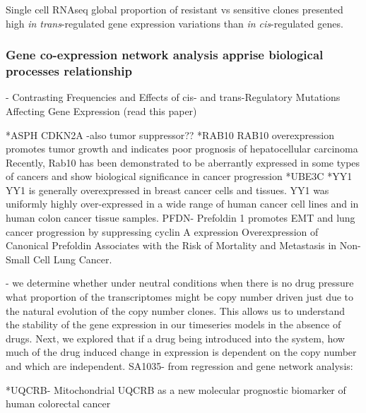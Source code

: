
{Single cell RNAseq global proportion of resistant vs sensitive clones presented high \textit{in trans}-regulated gene expression variations than \textit{in cis}-regulated genes.}

\subsubsection{Gene co-expression network analysis apprise biological processes relationship}


- Contrasting Frequencies and Effects of cis- and trans-Regulatory Mutations Affecting Gene Expression (read this paper)



*ASPH \cite{li2018expression, hou2018recent, kanwal2020aspartate, lin2019asph}
CDKN2A \cite{shahidsales2018genetic}-also tumor suppressor??
*RAB10 \cite{wang2017rab10}RAB10 overexpression promotes tumor growth and indicates poor prognosis of hepatocellular carcinoma
Recently, Rab10 has been demonstrated to be aberrantly expressed in some types of cancers and show biological significance in cancer progression \cite{he2002identification, jiang2016mir}
*UBE3C \cite{xiong2019mir, pan2015ubiquitin, zhang2020ube3c}
*YY1 \cite{wan2012yin, chinnappan2009transcription, meliala2020biological} 
YY1 is generally overexpressed in breast cancer cells and tissues.
YY1 was uniformly highly over-expressed in a wide range of human cancer cell lines and in human colon cancer tissue samples.
PFDN-   Prefoldin 1 promotes EMT and lung cancer progression by suppressing cyclin A expression
Overexpression of Canonical Prefoldin Associates with the Risk of Mortality and Metastasis in Non-Small Cell Lung Cancer. 

- we determine whether under neutral conditions when there is no drug pressure what proportion of the transcriptomes might be copy number driven just due to the natural evolution of the copy number clones. This allows us to understand the stability of the gene expression in our timeseries models in the absence of drugs. 
 Next, we explored that if a drug being introduced into the system, how much of the drug induced change in expression is dependent on the copy number and which are independent.
SA1035- from regression and gene network analysis:

*UQCRB-
Mitochondrial UQCRB as a new molecular prognostic biomarker of human colorectal cancer \cite{kim2017mitochondrial}

